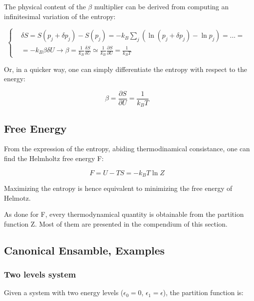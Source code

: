 \documentclass{article}
\begin{document}
The physical content of the $\beta$ multiplier can be derived from computing
an infinitesimal variation of the entropy:

\begin{equation}
    \left\{
    \begin{aligned}
         & \delta S= S(p_j+\delta p_j)-S(p_j) = -k_B\sum_{j}(\ln{(p_j+\delta p_j)}-\ln{p_j})=...=                                                        \\
         & = -k_B\beta\delta U \rightarrow \beta=\frac{1}{k_B}\frac{\delta S}{\delta U}\simeq \frac{1}{k_B}\frac{\partial S}{\partial U}= \frac{1}{k_BT}
    \end{aligned}
    \right.
\end{equation}

Or, in a quicker way, one can simply differentiate the entropy with respect to the energy:

\begin{equation}
    \beta=\frac{\partial S}{\partial U}= \frac{1}{k_BT}
\end{equation}

\subsection{Free Energy}
From the expression of the entropy, abiding thermodinamical consistance, one can find the Helmholtz free energy F:

\begin{equation}
    F=U-TS=-k_BT\ln{Z}
\end{equation}

Maximizing the entropy is hence equivalent to minimizing the free energy of Helmotz.

As done for F, every thermodynamical quantity is obtainable from the partition function Z.
Most of them are presented in the compendium of this section.

\subsection{Canonical Ensamble, Examples}

\subsubsection{Two levels system}

Given a system with two energy levels ($\epsilon_0=0$, $\epsilon_1=\epsilon$), the partition function is:
\end{document}
